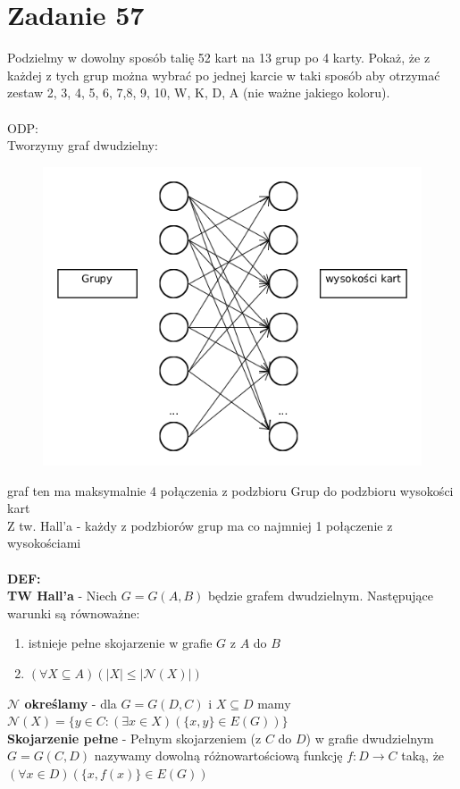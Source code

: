 \documentclass{article}
\begin{document}
\section{\centering Zadanie 57 }
Podzielmy w dowolny sposób talię 52 kart na 13 grup po 4 karty. Pokaż, że z każdej z tych grup można wybrać po jednej karcie w taki sposób aby otrzymać zestaw 2, 3, 4, 5, 6, 7,8, 9, 10, W, K, D, A (nie ważne jakiego koloru).\\\\
ODP:\\
Tworzymy graf dwudzielny:
\begin{figure}[H]
	\centering
	\includegraphics[width=0.5\linewidth]{z57.png}  
\end{figure}
\noindent graf ten ma maksymalnie 4 połączenia z podzbioru Grup do podzbioru wysokości kart\\
Z tw. Hall'a - każdy z podzbiorów grup ma co najmniej 1 połączenie z wysokościami\\\\
\noindent \textbf{DEF:} \\
\textbf{TW Hall'a} - Niech $G=G(A,B)$ będzie grafem dwudzielnym. Następujące warunki są równoważne:
\begin{enumerate}
	\item istnieje pełne skojarzenie w grafie $G$ z $A$ do $B$
	\item $(\forall X \subseteq A)(|X| \leq |\mathcal{N}(X)|)$
\end{enumerate}
\textbf{$\mathcal{N}$ określamy} - dla $G = G(D,C)$ i $X \subseteq D$ mamy $\mathcal{N}(X) = \{y \in C : (\exists x \in X)(\{x,y\} \in E(G))\}$\\
\textbf{Skojarzenie pełne} - Pełnym skojarzeniem (z $C$ do $D$) w grafie dwudzielnym $G=G(C,D)$ nazywamy dowolną różnowartościową funkcję $f:D\rightarrow C$ taką, że $(\forall x \in D)(\{x,f(x)\} \in E(G))$
\end{document}
